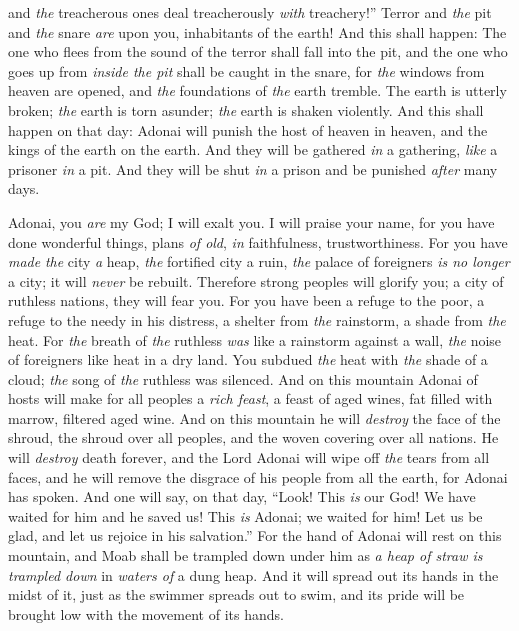 \begin{biblechapter}
and \textit{the} treacherous ones deal treacherously \textit{with} treachery!”
\verse Terror and \textit{the} pit and \textit{the} snare \textit{are} upon you, inhabitants of the earth!
\verse And this shall happen:
\verse The one who flees from the sound of the terror shall fall into the pit, 
and the one who goes up from \textit{inside the pit} shall be caught in the snare, 
for \textit{the} windows from heaven are opened, 
and \textit{the} foundations of \textit{the} earth tremble.
\verse The earth is utterly broken; 
\textit{the} earth is torn asunder; 
\textit{the} earth is shaken violently.
\verse And this shall happen on that day:
\verse Adonai will punish the host of heaven in heaven, 
and the kings of the earth on the earth.
\verse And they will be gathered \textit{in} a gathering, \textit{like} a prisoner \textit{in} a pit. 
And they will be shut \textit{in} a prison and be punished \textit{after} many days.
\end{biblechapter}

\begin{biblechapter} %
 Adonai, you \textit{are} my God; I will exalt you. 
I will praise your name, 
for you have done wonderful things, 
plans \textit{of old}, \textit{in} faithfulness, trustworthiness.
\verse For you have \textit{made} \textit{the} city \textit{a} heap, 
\textit{the} fortified city a ruin, 
\textit{the} palace of foreigners \textit{is no longer} a city; 
it will \textit{never} be rebuilt.
\verse Therefore strong peoples will glorify you; 
a city of ruthless nations, they will fear you.
\verse For you have been a refuge to the poor, 
a refuge to the needy in his distress, 
a shelter from \textit{the} rainstorm, 
a shade from \textit{the} heat. 
For \textit{the} breath of \textit{the} ruthless \textit{was} like a rainstorm against a wall,
\verse \textit{the} noise of foreigners like heat in a dry land. 
You subdued \textit{the} heat with \textit{the} shade of a cloud; 
\textit{the} song of \textit{the} ruthless was silenced.
\verse And on this mountain Adonai of hosts will make for all peoples a \textit{rich feast}, 
a feast of aged wines, fat filled with marrow, filtered aged wine.
\verse And on this mountain he will \textit{destroy} the face of the shroud, 
the shroud over all peoples, 
and the woven covering over all nations.
\verse He will \textit{destroy} death forever, 
and the Lord Adonai will wipe off \textit{the} tears from all faces, 
and he will remove the disgrace of his people from all the earth, for Adonai has spoken.
\verse And one will say, on that day,
\verse “Look! This \textit{is} our God! We have waited for him and he saved us! 
This \textit{is} Adonai; we waited for him! 
Let us be glad, 
and let us rejoice in his salvation.”
\verse For the hand of Adonai will rest on this mountain, 
and Moab shall be trampled down under him 
as \textit{a heap of straw is trampled down} in \textit{waters of} a dung heap.
\verse And it will spread out its hands in the midst of it, 
just as the swimmer spreads out to swim, 
and its pride will be brought low with the movement of its hands.
\end{biblechapter}

